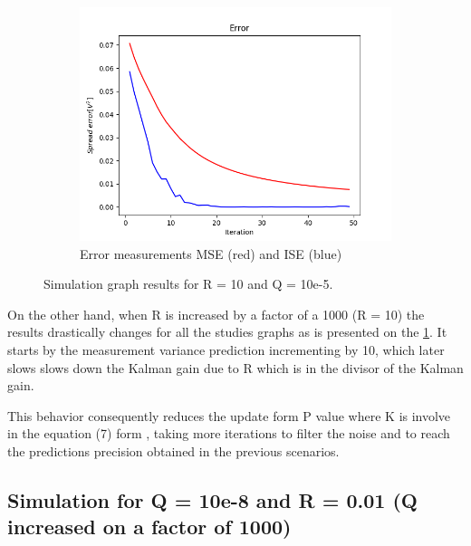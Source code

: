 \documentclass{article}
\begin{document}
\begin{figure}[H]
\begin{subfigure} {.5\textwidth}
        \end{subfigure}
        \begin{subfigure}{.5\textwidth}            
            \centering
            \includegraphics[width=0.6\linewidth]{./img/r10q_E.png}
            \caption{Error measurements MSE (red) and ISE (blue)}
        \end{subfigure}
        \caption{Simulation graph results for R = 10 and Q = 10e-5.}
        \label{fig:simulation3}
    \end{figure}

    On the other hand, when R is increased by a factor of a 1000 (R = 10) the results drastically changes for
    all the studies graphs as is presented on the \ref{fig:simulation3}. It starts by the measurement variance
    prediction incrementing by 10, which later slows slows down the Kalman gain due to R which is in the divisor
    of the Kalman gain.
    
    This behavior consequently reduces the update form P value where K is involve in the equation (7) form \cite{LabManual},
    taking more iterations to filter the noise and to reach the predictions precision obtained in the 
    previous scenarios.

    \subsection{Simulation for Q = 10e-8 and R = 0.01 (Q increased on a factor of 1000)}
    
\end{document}
